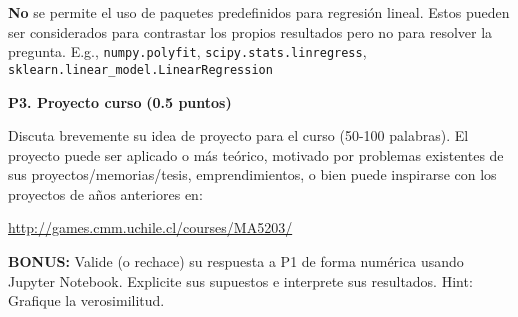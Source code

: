 \documentclass[11pt,letterpaper]{article}
\begin{document}
 \textbf{No} se permite el uso de paquetes predefinidos para regresión lineal. Estos pueden ser considerados para contrastar los propios resultados pero no para resolver la pregunta. E.g., \texttt{numpy.polyfit},  \texttt{scipy.stats.linregress}, \texttt{sklearn.linear\_model.LinearRegression}

\vspace{5 mm}
\noindent\textbf{P3. Proyecto curso} \textbf{(0.5 puntos)}
\vspace{5 mm}

Discuta brevemente su idea de proyecto para el curso (50-100 palabras). El proyecto puede ser aplicado o más teórico, motivado por problemas existentes de sus proyectos/memorias/tesis, emprendimientos, o bien puede inspirarse con los proyectos de años anteriores en:

\vspace{1em}
\centerline{\url{http://games.cmm.uchile.cl/courses/MA5203/}}
\vspace{1em}


\vspace{2em}

\noindent\textbf{BONUS:}
Valide (o rechace) su respuesta a P1 de forma numérica usando Jupyter Notebook. Explicite sus supuestos e interprete sus resultados. Hint: Grafique la verosimilitud.
\end{document}
